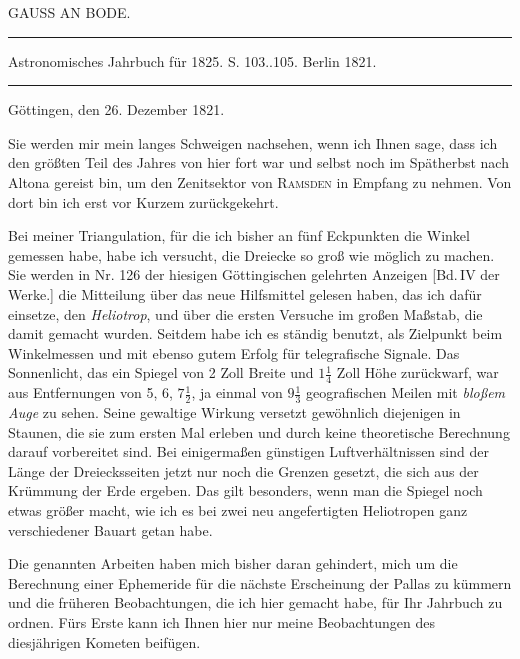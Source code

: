 \clearpage
{}
\hypertarget{native-444-part-lower}{}
\begin{center}
{\large GAUSS AN BODE.}

\noindent\rule{\linewidth}{0.4pt}

Astronomisches Jahrbuch für 1825. S. 103..105. Berlin 1821.

\noindent\rule{\linewidth}{0.4pt}
\end{center}

\begin{flushright}
Göttingen, den 26. Dezember 1821.
\end{flushright}

Sie werden mir mein langes Schweigen nachsehen, wenn ich Ihnen sage, dass ich den größten Teil des Jahres von hier fort war und selbst noch im Spätherbst nach Altona gereist bin, um den Zenitsektor von \textsc{Ramsden} in Empfang zu nehmen. Von dort bin ich erst vor Kurzem zurückgekehrt.

Bei meiner Triangulation, für die ich bisher an fünf Eckpunkten die Winkel gemessen habe, habe ich versucht, die Dreiecke so groß wie möglich zu machen. Sie werden in Nr. 126 der hiesigen Göttingischen gelehrten Anzeigen [Bd.\,IV der Werke.] die Mitteilung über das neue Hilfsmittel gelesen haben, das ich dafür einsetze, den \emph{Heliotrop}, und über die ersten Versuche im großen Maßstab, die damit gemacht wurden. Seitdem habe ich es ständig benutzt, als Zielpunkt beim Winkelmessen und mit ebenso gutem Erfolg für telegrafische Signale. Das Sonnenlicht, das ein Spiegel von 2 Zoll Breite und $1\tfrac{1}{4}$ Zoll Höhe zurückwarf, war aus Entfernungen von 5, 6, $7\tfrac{1}{2}$, ja einmal von $9\tfrac{1}{3}$ geografischen Meilen mit \emph{bloßem Auge} zu sehen. Seine gewaltige Wirkung versetzt gewöhnlich diejenigen in Staunen, die sie zum ersten Mal erleben und durch keine theoretische Berechnung darauf vorbereitet sind. Bei einigermaßen günstigen Luftverhältnissen sind der Länge der Dreiecksseiten jetzt nur noch die Grenzen gesetzt, die sich aus der Krümmung der Erde ergeben. Das gilt besonders, wenn man die Spiegel noch etwas größer macht, wie ich es bei zwei neu angefertigten Heliotropen ganz verschiedener Bauart getan habe.

Die genannten Arbeiten haben mich bisher daran gehindert, mich um die Berechnung einer Ephemeride für die nächste Erscheinung der Pallas zu kümmern und die früheren Beobachtungen, die ich hier gemacht habe, für Ihr Jahrbuch zu ordnen. Fürs Erste kann ich Ihnen hier nur meine Beobachtungen des diesjährigen Kometen beifügen.


